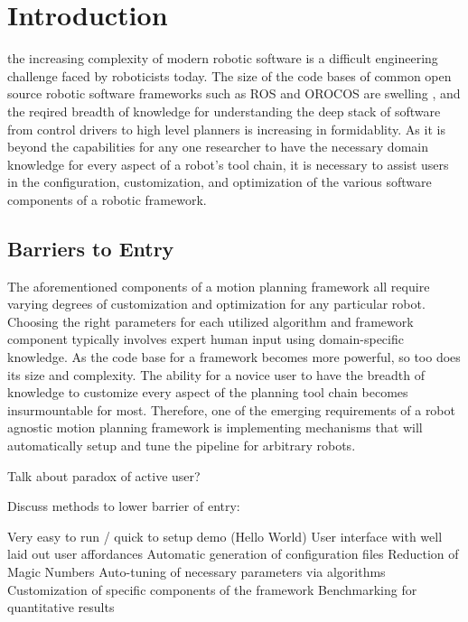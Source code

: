 \documentclass[10pt,journal,compsoc]{joser1}
\begin{document}
\maketitle


\section{Introduction}
 {the increasing complexity of modern robotic software is a difficult engineering challenge faced by roboticists today. The size of the code bases of common open source robotic software frameworks such as ROS \cite{quigley2009ros} and OROCOS \cite{bruyninckx2001open} are swelling \cite{makarenko2007benefits}, and the reqired breadth of knowledge for understanding the deep stack of software from control drivers to high level planners is increasing in formidablity. As it is beyond the capabilities for any one researcher to have the necessary domain knowledge for every aspect of a robot's tool chain, it is necessary to assist users in the configuration, customization, and optimization of the various software components of a robotic framework. 

\subsection{Barriers to Entry}

The aforementioned components of a motion planning framework all require varying degrees of customization and optimization for any particular robot. Choosing the right parameters for each utilized algorithm and framework component typically involves expert human input using domain-specific knowledge. As the code base for a framework becomes more powerful, so too does its size and complexity. The ability for a novice user to have the breadth of knowledge to customize every aspect of the planning tool chain becomes insurmountable for most. Therefore, one of the emerging requirements of a robot agnostic motion planning framework is implementing mechanisms that will automatically setup and tune the pipeline for arbitrary robots.

Talk about paradox of active user?

Discuss methods to lower barrier of entry:

Very easy to run / quick to setup demo (Hello World)
User interface with well laid out user affordances
Automatic generation of configuration files
Reduction of Magic Numbers
Auto-tuning of necessary parameters via algorithms
Customization of specific components of the framework
Benchmarking for quantitative results

}
\end{document}

